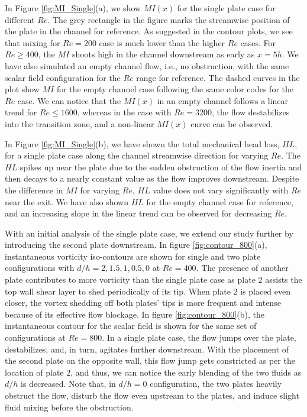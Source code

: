 \documentclass[reprint,a4paper,fleqn]{cas-dc} %
\begin{document}
		In Figure \ref{fig:MI_Single}(a), we show $MI(x)$ for the single plate case for different $Re$. The grey rectangle in the figure marks the streamwise position of the plate in the channel for reference. As suggested in the contour plots, we see that mixing for $Re=200$ case is much lower than the higher $Re$ cases. For $Re\geq400$, the $MI$ shoots high in the channel downstream as early as $x=5h$. We have also simulated an empty channel flow, i.e., no obstruction, with the same scalar field configuration for the $Re$ range for reference. The dashed curves in the plot show $MI$ for the empty channel case following the same color codes for the $Re$ case. We can notice that the $MI(x)$ in an empty channel follows a linear trend for $Re\leq1600$, whereas in the case with $Re=3200$, the flow destabilizes into the transition zone, and a non-linear $MI(x)$ curve can be observed.

		In Figure \ref{fig:MI_Single}(b), we have shown the total mechanical head loss, $HL$, for a single plate case along the channel streamwise direction for varying $Re$. The $HL$ spikes up near the plate due to the sudden obstruction of the flow inertia and then decays to a nearly constant value as the flow improves downstream. Despite the difference in $MI$ for varying $Re$, $HL$ value does not vary significantly with $Re$ near the exit. We have also shown $HL$ for the empty channel case for reference, and an increasing slope in the linear trend can be observed for decreasing $Re$.

		
		With an initial analysis of the single plate case, we extend our study further by introducing the second plate downstream. In figure \ref{fig:contour_800}(a), instantaneous vorticity iso-contours are shown for single and two plate configurations with $d/h=2,1.5,1,0.5,0$ at $Re=400$. The presence of another plate contributes to more vorticity than the single plate case as plate 2 assists the top wall shear layer to shed periodically of its tip. When plate 2 is placed even closer, the vortex shedding off both plates' tips is more frequent and intense because of its effective flow blockage. In figure  \ref{fig:contour_800}(b), the instantaneous contour for the scalar field is shown for the same set of configurations at $Re=800$. In a single plate case, the flow jumps over the plate, destabilizes, and, in turn, agitates further downstream. With the placement of the second plate on the opposite wall, this flow jump gets constricted as per the location of plate 2, and thus, we can notice the early blending of the two fluids as $d/h$ is decreased. Note that, in $d/h=0$ configuration, the two plates heavily obstruct the flow, disturb the flow even upstream to the plates, and induce slight fluid mixing before the obstruction.
\end{document}
